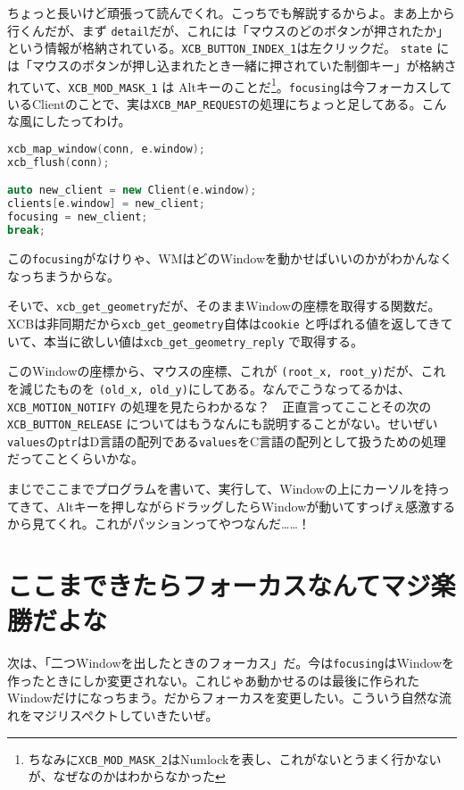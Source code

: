 \documentclass[12pt,a4paper]{jsarticle}
\begin{document}
ちょっと長いけど頑張って読んでくれ。こっちでも解説するからよ。まあ上から行くんだが、まず \lstinline{detail}だが、これには「マウスのどのボタンが押されたか」という情報が格納されている。\lstinline{XCB_BUTTON_INDEX_1}は左クリックだ。 \lstinline{state} には「マウスのボタンが押し込まれたとき一緒に押されていた制御キー」が格納されていて、\lstinline{XCB_MOD_MASK_1} は Altキーのことだ\footnote{ちなみに\lstinline{XCB_MOD_MASK_2}はNumlockを表し、これがないとうまく行かないが、なぜなのかはわからなかった}。\lstinline{focusing}は今フォーカスしているClientのことで、実は\lstinline{XCB_MAP_REQUEST}の処理にちょっと足してある。こんな風にしたってわけ。

\begin{lstlisting}[language=C++]
xcb_map_window(conn, e.window);
xcb_flush(conn);

auto new_client = new Client(e.window);
clients[e.window] = new_client;
focusing = new_client;
break;
\end{lstlisting}

この\lstinline{focusing}がなけりゃ、WMはどのWindowを動かせばいいのかがわかんなくなっちまうからな。

そいで、\lstinline{xcb_get_geometry}だが、そのままWindowの座標を取得する関数だ。XCBは非同期だから\lstinline{xcb_get_geometry}自体は\lstinline{cookie} と呼ばれる値を返してきていて、本当に欲しい値は\lstinline{xcb_get_geometry_reply} で取得する。

このWindowの座標から、マウスの座標、これが \lstinline{(root_x, root_y)}だが、これを減じたものを \lstinline{(old_x, old_y)}にしてある。なんでこうなってるかは、\lstinline{XCB_MOTION_NOTIFY} の処理を見たらわかるな？　正直言ってこことその次の \lstinline{XCB_BUTTON_RELEASE} についてはもうなんにも説明することがない。せいぜい\lstinline{values}の\lstinline{ptr}はD言語の配列である\lstinline{values}をC言語の配列として扱うための処理だってことくらいかな。

まじでここまでプログラムを書いて、実行して、Windowの上にカーソルを持ってきて、Altキーを押しながらドラッグしたらWindowが動いてすっげぇ感激するから見てくれ。これがパッションってやつなんだ……！

\section{ここまできたらフォーカスなんてマジ楽勝だよな}

次は、「二つWindowを出したときのフォーカス」だ。今は\lstinline{focusing}はWindowを作ったときにしか変更されない。これじゃあ動かせるのは最後に作られたWindowだけになっちまう。だからフォーカスを変更したい。こういう自然な流れをマジリスペクトしていきたいぜ。
\end{document}
